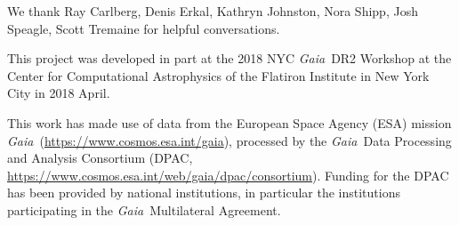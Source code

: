 \documentclass[twocolumn]{aastex62}
\newcommand{\acronym}[1]{{\small{#1}}}
\newcommand{\gaia}{\textsl{Gaia}}
\begin{document}
\vspace{0.5cm}
\acknowledgements
We thank Ray Carlberg, Denis Erkal, Kathryn Johnston, Nora Shipp, Josh Speagle, Scott Tremaine for helpful conversations.

This project was developed in part at the 2018 \acronym{NYC} \gaia\ \acronym{DR2} Workshop at the Center for Computational Astrophysics of the Flatiron Institute in New York City in 2018 April.

This work has made use of data from the European Space Agency (\acronym{ESA}) mission \gaia\ (\url{https://www.cosmos.esa.int/gaia}), processed by the \gaia\ Data Processing and Analysis Consortium (\acronym{DPAC}, \url{https://www.cosmos.esa.int/web/gaia/dpac/consortium}). Funding for the \acronym{DPAC} has been provided by national institutions, in particular the institutions participating in the \gaia\ Multilateral Agreement.

%
%
\end{document}
